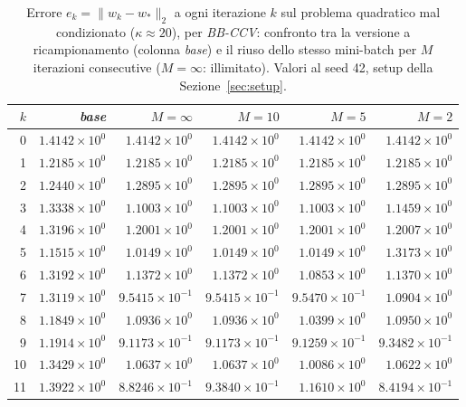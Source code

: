 \begin{table}[H]
\centering
\footnotesize
\renewcommand{\arraystretch}{0.85}
\setlength{\tabcolsep}{4pt}
\caption{Errore $e_k=\|w_k-w_*\|_2$ a ogni iterazione $k$ sul problema quadratico mal condizionato ($\kappa\approx 20$), per \emph{BB-CCV}: confronto tra la versione a ricampionamento (colonna \emph{base}) e il riuso dello stesso mini-batch per $M$ iterazioni consecutive ($M=\infty$: illimitato). Valori al seed 42, setup della Sezione~\ref{sec:setup}.}
\label{tab:riuso_malcond_bb}
\begin{tabular}{@{}rrrrrr@{}}
\toprule
$k$ & \emph{base} & $M{=}\infty$ & $M{=}10$ & $M{=}5$ & $M{=}2$\\
\midrule
0 & $1.4142\times10^{0}$ & $1.4142\times10^{0}$ & $1.4142\times10^{0}$ & $1.4142\times10^{0}$ & $1.4142\times10^{0}$\\
1 & $1.2185\times10^{0}$ & $1.2185\times10^{0}$ & $1.2185\times10^{0}$ & $1.2185\times10^{0}$ & $1.2185\times10^{0}$\\
2 & $1.2440\times10^{0}$ & $1.2895\times10^{0}$ & $1.2895\times10^{0}$ & $1.2895\times10^{0}$ & $1.2895\times10^{0}$\\
3 & $1.3338\times10^{0}$ & $1.1003\times10^{0}$ & $1.1003\times10^{0}$ & $1.1003\times10^{0}$ & $1.1459\times10^{0}$\\
4 & $1.3196\times10^{0}$ & $1.2001\times10^{0}$ & $1.2001\times10^{0}$ & $1.2001\times10^{0}$ & $1.2007\times10^{0}$\\
5 & $1.1515\times10^{0}$ & $1.0149\times10^{0}$ & $1.0149\times10^{0}$ & $1.0149\times10^{0}$ & $1.3173\times10^{0}$\\
6 & $1.3192\times10^{0}$ & $1.1372\times10^{0}$ & $1.1372\times10^{0}$ & $1.0853\times10^{0}$ & $1.1370\times10^{0}$\\
7 & $1.3119\times10^{0}$ & $9.5415\times10^{-1}$ & $9.5415\times10^{-1}$ & $9.5470\times10^{-1}$ & $1.0904\times10^{0}$\\
8 & $1.1849\times10^{0}$ & $1.0936\times10^{0}$ & $1.0936\times10^{0}$ & $1.0399\times10^{0}$ & $1.0950\times10^{0}$\\
9 & $1.1914\times10^{0}$ & $9.1173\times10^{-1}$ & $9.1173\times10^{-1}$ & $9.1259\times10^{-1}$ & $9.3482\times10^{-1}$\\
10 & $1.3429\times10^{0}$ & $1.0637\times10^{0}$ & $1.0637\times10^{0}$ & $1.0086\times10^{0}$ & $1.0622\times10^{0}$\\
11 & $1.3922\times10^{0}$ & $8.8246\times10^{-1}$ & $9.3840\times10^{-1}$ & $1.1610\times10^{0}$ & $8.4194\times10^{-1}$\\

\end{tabular}
\end{table}
